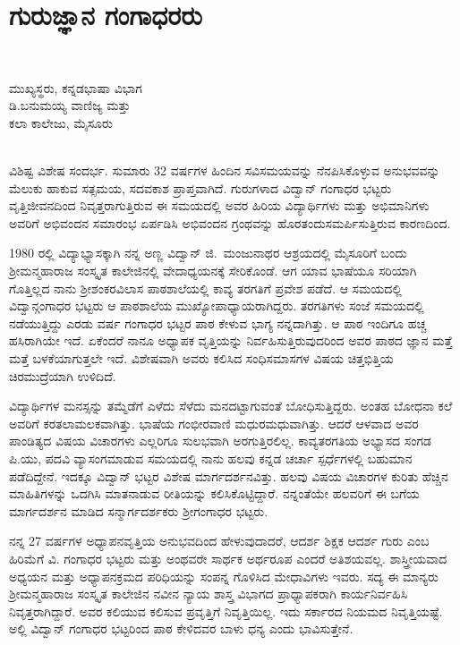 {\fontsize{14}{16}\selectfont
\chapter{ಗುರುಜ್ಞಾನ ಗಂಗಾಧರರು}

~\\[-1.7cm]

\begin{center}

ಮುಖ್ಯಸ್ಥರು, ಕನ್ನಡಭಾಷಾ ವಿಭಾಗ\\
ಡಿ.ಬನುಮಯ್ಯ ವಾಣಿಜ್ಯ ಮತ್ತು \\
ಕಲಾ ಕಾಲೇಜು, ಮೈಸೂರು
\addrule
\end{center}

~\\[-1.5cm]

\noindent
ವಿಶಿಷ್ಟ ವಿಶೇಷ ಸಂದರ್ಭ. ಸುಮಾರು 32 ವರ್ಷಗಳ ಹಿಂದಿನ ಸವಿಸಮಯವನ್ನು ನೆನಪಿಸಿಕೊಳ್ಳುವ ಅನುಭವವನ್ನು ಮೆಲುಕು ಹಾಕುವ ಸತ್ಸಮಯ, ಸದವಕಾಶ ಪ್ರಾಪ್ತವಾಗಿದೆ. ಗುರುಗಳಾದ ವಿದ್ವಾನ್ ಗಂಗಾಧರ ಭಟ್ಟರು ವೃತ್ತಿಜೀವನದಿಂದ ನಿವೃತ್ತರಾಗು\-ತ್ತಿರುವ ಈ ಸಮಯದಲ್ಲಿ ಅವರ ಹಿರಿಯ ವಿದ್ಯಾರ್ಥಿಗಳು ಮತ್ತು ಅಭಿಮಾನಿಗಳು ಅವರಿಗೆ ಅಭಿವಂದನ ಸಮಾರಂಭ ಏರ್ಪಡಿಸಿ ಅಭಿವಂದನ ಗ್ರಂಥವನ್ನು ಹೊರತಂದು\break ಸಮರ್ಪಿಸುತ್ತಿರುವ ಕಾರಣದಿಂದ.

1980 ರಲ್ಲಿ ವಿದ್ಯಾಭ್ಯಾಸಕ್ಕಾಗಿ ನನ್ನ ಅಣ್ಣ ವಿದ್ವಾನ್ ಜಿ.\ ಮಂಜುನಾಥರ ಆಶ್ರಯದಲ್ಲಿ ಮೈಸೂರಿಗೆ ಬಂದು ಶ್ರೀಮನ್ಮಹಾರಾಜ ಸಂಸ್ಕೃತ ಕಾಲೇಜಿನಲ್ಲಿ ವೇದಾಧ್ಯಯನಕ್ಕೆ ಸೇರಿಕೊಂಡೆ. ಆಗ ಯಾವ ಭಾಷೆಯೂ ಸರಿಯಾಗಿ ಗೊತ್ತಿಲ್ಲದ ನಾನು ಶ್ರೀಶಂಕರ\-ವಿಲಾಸ ಪಾಠಶಾಲೆಯಲ್ಲಿ ಕಾವ್ಯ ತರಗತಿಗೆ ಪ್ರವೇಶ ಪಡೆದೆ. ಆ ಸಮಯದಲ್ಲಿ ವಿದ್ವಾನ್\break ಗಂಗಾಧರ ಭಟ್ಟರು ಆ ಪಾಠಶಾಲೆಯ ಮುಖ್ಯೋಪಾಧ್ಯಾಯರಾಗಿದ್ದರು. ತರಗತಿಗಳು ಸಂಜೆ ಸಮಯದಲ್ಲಿ ನಡೆಯುತ್ತಿದ್ದು ಎರಡು ವರ್ಷ ಗಂಗಾಧರ ಭಟ್ಟರ ಪಾಠ ಕೇಳುವ ಭಾಗ್ಯ ನನ್ನದಾಗಿತ್ತು. ಆ ಪಾಠ ಇಂದಿಗೂ ಹಚ್ಚ ಹಸಿರಾಗಿಯೇ ಇದೆ. ಏಕೆಂದರೆ ನಾನೂ ಅಧ್ಯಾಪಕ ವೃತ್ತಿಯನ್ನು ನಿರ್ವಹಿಸುತ್ತಿರುವುದರಿಂದ ಅವರ ಪಾಠದ ಜ್ಞಾನ ಮತ್ತೆ ಮತ್ತೆ ಬಳಕೆಯಾಗುತ್ತಲೇ ಇದೆ. ವಿಶೇಷವಾಗಿ ಅವರು ಕಲಿಸಿದ ಸಂಧಿ\enginline{-}ಸಮಾಸಗಳ ವಿಷಯ ಚಿತ್ತಭಿತ್ತಿಯ ಚಿರಮುದ್ರೆಯಾಗಿ ಉಳಿದಿದೆ. 

ವಿದ್ಯಾರ್ಥಿಗಳ ಮನಸ್ಸನ್ನು ತಮ್ಮೆಡೆಗೆ ಎಳೆದು ಸೆಳೆದು ಮನದಟ್ಟಾಗುವಂತೆ ಬೋಧಿಸುತ್ತಿದ್ದರು. ಅಂತಹ ಬೋಧನಾ ಕಲೆ ಅವರಿಗೆ ಕರತಲಾಮಲಕವಾಗಿತ್ತು. ಭಾಷೆಯ ಗಂಭೀರವಾಣಿ ಮಧುರಮಧುವಾಗಿತ್ತು. ಆದರೆ ಆಳವಾದ ಅವರ ಪಾಂಡಿತ್ಯದ ವಿಷಯ ವಿಚಾರಗಳು ಎಲ್ಲರಿಗೂ ಸುಲಭವಾಗಿ ಅರಗುತ್ತಿರಲಿಲ್ಲ. ಕಾವ್ಯತರಗತಿಯ ಅಭ್ಯಾಸದ ಸಂಗಡ ಪಿ.ಯು, ಪದವಿ ವ್ಯಾಸಂಗಮಾಡುವ ಸಮಯದಲ್ಲಿ ನಾನು ಹಲವು ಕನ್ನಡ ಚರ್ಚಾ ಸ್ಪರ್ಧೆಗಳಲ್ಲಿ ಬಹುಮಾನ ಪಡೆದಿದ್ದೇನೆ. ಇದಕ್ಕೂ ವಿದ್ವಾನ್ ಭಟ್ಟರ ವಿಶೇಷ ಮಾರ್ಗದರ್ಶನವಿತ್ತು. ಹಲವು ವಿಷಯ ವಿಚಾರಗಳ ಕುರಿತು ಹೆಚ್ಚಿನ ಮಾಹಿತಿಗಳನ್ನು ಒದಗಿಸಿ ಮಾತನಾಡುವ ರೀತಿಯನ್ನು ಕಲಿಸಿಕೊಟ್ಟಿದ್ದಾರೆ. ನನ್ನಂತೆಯೇ ಹಲವರಿಗೆ ಈ ಬಗೆಯ ಮಾರ್ಗದರ್ಶನ ಮಾಡಿದ ಸನ್ಮಾರ್ಗದರ್ಶಕರು ಶ್ರೀಗಂಗಾಧರ ಭಟ್ಟರು. 

ನನ್ನ 27 ವರ್ಷಗಳ ಅಧ್ಯಾಪನವೃತ್ತಿಯ ಅನುಭವದಿಂದ ಹೇಳುವುದಾದರೆ, ಆದರ್ಶ ಶಿಕ್ಷಕ ಆದರ್ಶ ಗುರು ಎಂಬ ಹಿರಿಮೆಗೆ ವಿ. ಗಂಗಾಧರ ಭಟ್ಟರು ಮತ್ತು ಅಂಥವರೇ ಸಾರ್ಥಕ ಅರ್ಥರೂಪ ಎಂದರೆ ಅತಿಶಯವಲ್ಲ. ಶಾಸ್ತ್ರೀಯವಾದ ಅಧ್ಯಯನ ಮತ್ತು ಅಧ್ಯಾಪನಕ್ರಮದ ಪರಿಧಿಯನ್ನು ಸಂಪನ್ನ ಗೊಳಿಸಿದ ಮೇಧಾವಿಗಳು ಇವರು. ಸದ್ಯ ಈ ಮಾನ್ಯರು ಶ್ರೀಮನ್ಮಹಾರಾಜ ಸಂಸ್ಕೃತ ಕಾಲೇಜಿನ ನವೀನ ನ್ಯಾಯ ಶಾಸ್ತ್ರ ವಿಭಾಗದ ಪ್ರಾಧ್ಯಾಪಕರಾಗಿ ಕಾರ್ಯನಿರ್ವಹಿಸಿ ನಿವೃತ್ತರಾಗಿದ್ದಾರೆ. ಅವರ ಕಲಿಯುವ ಕಲಿಸುವ ಪ್ರವೃತ್ತಿಗೆ ನಿವೃತ್ತಿಯಿಲ್ಲ. ಇದು ಸರ್ಕಾರದ ನಿಯಮದ ನಿವೃತ್ತಿಯಷ್ಟೆ. ಅಲ್ಲಿ ವಿದ್ವಾನ್ ಗಂಗಾಧರ ಭಟ್ಟರಿಂದ ಪಾಠ ಕೇಳಿದವರ ಬಾಳು ಧನ್ಯ ಎಂದು ಭಾವಿಸುತ್ತೇನೆ.

}
